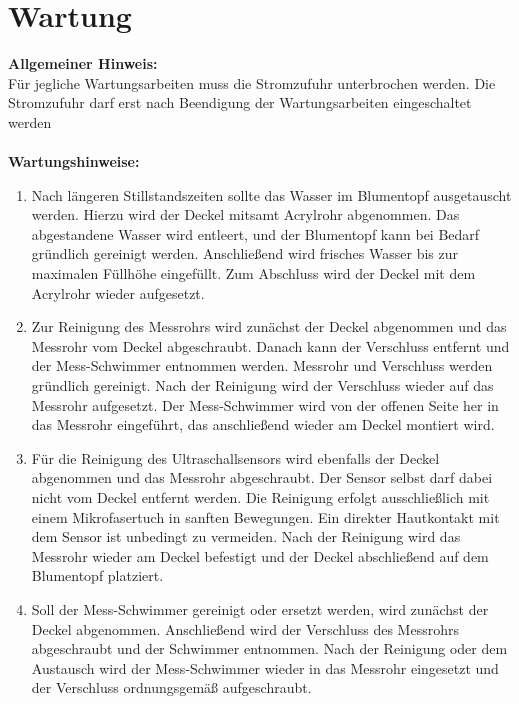 %
%

\chapter{Wartung}
	\textbf{Allgemeiner Hinweis:}\\
	Für jegliche Wartungsarbeiten muss die Stromzufuhr unterbrochen werden. Die Stromzufuhr darf erst nach Beendigung der Wartungsarbeiten eingeschaltet werden \\ \\
	\textbf{Wartungshinweise:}
	\begin{enumerate}
		\item Nach längeren Stillstandszeiten sollte das Wasser im Blumentopf ausgetauscht werden. Hierzu wird der Deckel mitsamt Acrylrohr abgenommen. Das abgestandene Wasser wird entleert, und der Blumentopf kann bei Bedarf gründlich gereinigt werden. Anschließend wird frisches Wasser bis zur maximalen Füllhöhe eingefüllt. Zum Abschluss wird der Deckel mit dem Acrylrohr wieder aufgesetzt.
		\item Zur Reinigung des Messrohrs wird zunächst der Deckel abgenommen und das Messrohr vom Deckel abgeschraubt. Danach kann der Verschluss entfernt und der Mess-Schwimmer entnommen werden. Messrohr und Verschluss werden gründlich gereinigt. Nach der Reinigung wird der Verschluss wieder auf das Messrohr aufgesetzt. Der Mess-Schwimmer wird von der offenen Seite her in das Messrohr eingeführt, das anschließend wieder am Deckel montiert wird.
		\item Für die Reinigung des Ultraschallsensors wird ebenfalls der Deckel abgenommen und das Messrohr abgeschraubt. Der Sensor selbst darf dabei nicht vom Deckel entfernt werden. Die Reinigung erfolgt ausschließlich mit einem Mikrofasertuch in sanften Bewegungen. Ein direkter Hautkontakt mit dem Sensor ist unbedingt zu vermeiden. Nach der Reinigung wird das Messrohr wieder am Deckel befestigt und der Deckel abschließend auf dem Blumentopf platziert.
		\item Soll der Mess-Schwimmer gereinigt oder ersetzt werden, wird zunächst der Deckel abgenommen. Anschließend wird der Verschluss des Messrohrs abgeschraubt und der Schwimmer entnommen. Nach der Reinigung oder dem Austausch wird der Mess-Schwimmer wieder in das Messrohr eingesetzt und der Verschluss ordnungsgemäß aufgeschraubt.
	\end{enumerate}
	 


